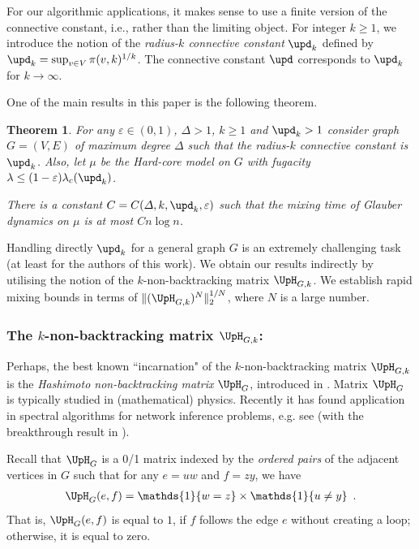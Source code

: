 \documentclass[11pt,reqno]{amsart}
\numberwithin{equation}{section}
\newtheorem{theorem}{Theorem}[section]
\newcommand{\blue}[1]{{\color{blue}#1}}
\newcommand{\bluepigment}[1]{{\color{blue(pigment)}#1}}
\newcommand{\byzantine}[1]{{\color{byzantine}#1}}
\newcommand{\cadmiumgreen}[1]{{\color{cadmiumgreen}#1}}
\newcommand{\cadmiumorange}[1]{{\color{cadmiumorange}#1}}
\newcommand{\deeppink}[1]{{\color{deeppink}#1}}
\newcommand{\electricviolet}[1]{{\color{electricviolet}#1}}
\newcommand{\goldenbrown}[1]{{\color{goldenbrown}#1}}
\newcommand{\red}[1]{{\color{red}#1}}
\newcommand{\Ind}{\mathds{1}}
\newcommand{\maxDeg}{{\Delta}}
\newcommand{\cconnective}{\goldenbrown{\upd}}
\newcommand{\lcritical}{{\lambda_c}}
\newcommand{\nnorm}[3]{\goldenbrown{\|} #1\goldenbrown{\|}^{#2}_{#3}}
\newcommand{\NBMatrix}{\cadmiumgreen{\UpH}_{G,\kk}}
\newcommand{\NBMatrixE}{\byzantine{\UpH}}
\renewcommand{\blue}[1]{#1}
\renewcommand{\bluepigment}[1]{#1}
\renewcommand{\byzantine}[1]{#1}
\renewcommand{\cadmiumgreen}[1]{#1}
\renewcommand{\cadmiumorange}[1]{#1}
\renewcommand{\deeppink}[1]{#1}
\renewcommand{\electricviolet}[1]{#1}
\renewcommand{\goldenbrown}[1]{#1}
\renewcommand{\red}[1]{#1}
\newcommand{\ke}{\blue{e}}
\newcommand{\kf}{\deeppink{f}}
\newcommand{\kk}{\bluepigment{k}}
\newcommand{\ku}{\red{u}}
\newcommand{\kv}{\electricviolet{v}}
\newcommand{\kw}{\blue{w}}
\newcommand{\ky}{\cadmiumorange{y}}%
\newcommand{\kz}{\cadmiumgreen{z}}
\renewcommand{\ke}{e}
\renewcommand{\kf}{f}
\renewcommand{\kk}{k}
\renewcommand{\ku}{u}
\renewcommand{\kv}{v}
\renewcommand{\kw}{w}
\renewcommand{\ky}{\cadmiumgreen{y}}
\renewcommand{\kz}{z}
\begin{document}
 

For our algorithmic applications, it makes sense to use  a  finite version of the connective constant, i.e., 
rather than the limiting object. For integer $\kk\geq 1$,  we introduce the notion of the 
{\em radius-$\kk$  connective constant}  $\cconnective_{\kk}$ defined by  $\cconnective_{\kk}=\sup_{\kv\in V}\pi(\kv,\kk)^{1/\kk}$.
The connective constant $\cconnective$ corresponds to   $\cconnective_{\kk}$ for $\kk\to\infty$. 



One of the main results in this paper is the following theorem. 


\begin{theorem}\label{thrm:HC4CCK}
For any $\varepsilon \in (0,1)$, $\maxDeg>1$, $\kk\geq 1$ and $\cconnective_{\kk}>1$ consider graph $G=(V,E)$ 
of maximum degree $\maxDeg$ such that the radius-$k$ connective constant is $\cconnective_{\kk}$.
% 
Also, let $\mu$ be the Hard-core model on $G$ with fugacity $\lambda\leq (1-\varepsilon)\lcritical(\cconnective_{\kk})$.

There is a constant $C=C(\maxDeg, \kk,  \cconnective_{\kk}, \varepsilon)$ such that the mixing time of Glauber dynamics on $\mu$ 
is at most $C n\log n$.
\end{theorem}



Handling directly $\cconnective_{\kk}$ for a general graph $G$ is an extremely challenging task 
(at least for the authors of this work). We obtain our results  indirectly by utilising  the notion of the
$\kk$-non-backtracking  matrix $\NBMatrix$. We establish rapid mixing  bounds  in terms of 
$\nnorm{ (\NBMatrix)^N}{1/N}{2}$,  where $N$ is a large number. 





\subsubsection*{The $k$-non-backtracking matrix $\NBMatrix$:}
Perhaps, the best known ``incarnation" of the $k$-non-backtracking matrix $\NBMatrix$ is  the  
{\em Hashimoto non-backtracking  matrix} $\NBMatrixE_G$,  introduced in \cite{Hash89}.   Matrix 
$\NBMatrixE_G$ is typically  studied in (mathematical) physics. Recently it has found  application 
in   spectral algorithms for network 
inference problems, e.g. see \cite{CKMZNBM,AbbeSandon14} (with the breakthrough result in \cite{NBMGnp}). 
 



Recall that $\NBMatrixE_G$ is  a 0/1 matrix indexed by the {\em ordered pairs} of the adjacent vertices
in $G$  such that for any $\ke=\ku\kw$ and $\kf=\kz \ky$, we have 
\begin{align}\nonumber 
\NBMatrixE_G(\ke, \kf) =\Ind\{\kw=\kz \}\times \Ind\{\ku\neq \ky\} \enspace.
\end{align}
That is, $\NBMatrixE_G(\ke, \kf)$ is equal to $1$, if $\kf$ follows the edge $\ke$ without creating a loop; 
otherwise,  it  is equal to zero. 
\end{document}
